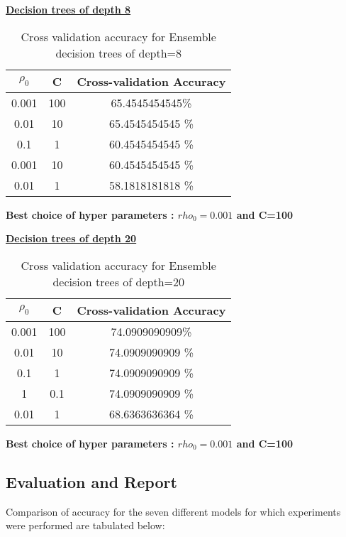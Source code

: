 \documentclass[11pt]{article}
\begin{document}
\begin{itemize}
\textbf{\underline{ Decision trees of depth 8}}

\begin{table}[h]
	\centering
	\begin{tabular}{|c|c| c|}
		\hline
		\textbf{$\rho_0$}  & \textbf{C} & \textbf{Cross-validation Accuracy} \\
		\hline
		0.001 & 100 & 65.4545454545\% \\
		\hline
		0.01 & 10 &  65.4545454545 \% \\
		\hline
		0.1 & 1 & 60.4545454545  \% \\
		\hline
		0.001 & 10 & 60.4545454545 \% \\
		\hline
		0.01& 1 &  58.1818181818 \% \\
		\hline   
	\end{tabular}
	\caption{Cross validation accuracy for Ensemble decision trees of depth=8}
	\label{t2}
\end{table}

\textbf{Best choice of hyper parameters : $rho_0=0.001$ and C=100}

\textbf{\underline{ Decision trees of depth 20}}

\begin{table}[h]
	\centering
	\begin{tabular}{|c|c| c|}
		\hline
		\textbf{$\rho_0$}  & \textbf{C} & \textbf{Cross-validation Accuracy} \\
		\hline
		0.001 & 100 & 74.0909090909\% \\
		\hline
		0.01 & 10 &  74.0909090909 \% \\
		\hline
		0.1 & 1 & 74.0909090909 \% \\
		\hline
		1 & 0.1 & 74.0909090909 \% \\
		\hline
		0.01& 1 &  68.6363636364 \% \\
		\hline   
	\end{tabular}
	\caption{Cross validation accuracy for Ensemble decision trees of depth=20}
	\label{t2}
\end{table}

\textbf{Best choice of hyper parameters : $rho_0=0.001$ and C=100}


\end{itemize}


\subsection{ Evaluation and Report}

Comparison of accuracy for the seven different models for which experiments were performed are tabulated below:
\end{document}
